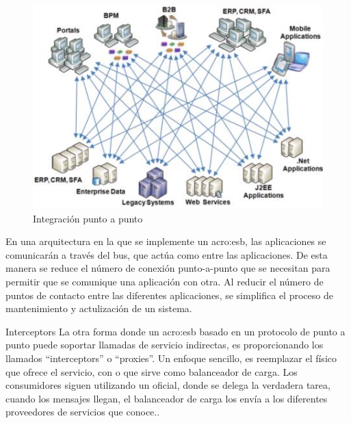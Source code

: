 \begin{figure}[H]
  \includegraphics[width=\linewidth]{src/images/02-capitulo-2/tecnologias/esb/point-to-point-integration.png}
  \caption{Integración punto a punto}
  \label{fig:point-to-point-integration}
\end{figure}



En una arquitectura en la que se implemente un \gls{acro:esb}, las aplicaciones se comunicarán a través del bus, que actúa como  entre las aplicaciones. De esta manera se reduce el número de conexión punto-a-punto que se necesitan para permitir que se comunique una aplicación con otra.  Al reducir el número de puntos de contacto entre las diferentes aplicaciones, se simplifica el proceso de mantenimiento y actulización de un sistema.


Interceptors
La otra forma donde un \gls{acro:esb} basado en un protocolo de punto a punto puede soportar llamadas de servicio indirectas, es proporcionando los llamados ``interceptors'' o ``proxies''. Un enfoque sencillo, es reemplazar el  físico que ofrece el servicio, con  o  que sirve como balanceador de carga. Los consumidores siguen utilizando un  oficial, donde se delega la verdadera tarea, cuando los mensajes llegan, el balanceador de carga los envía a los diferentes proveedores de servicios que conoce.\cite[p.~52]{josuttis2007}.

